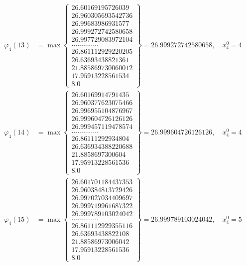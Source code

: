 \documentclass{article}
\begin{document}
\begin{align*}
  
  
  
\varphi_{4}(13) &= \max \left\{ \begin{array}{c}
26.60169195726039 \\
 26.960305693542736 \\
 26.99683986931577 \\
 26.999272742580658 \\
 26.997729083972104 \\
 .............. \\
 26.861112929220205 \\
 26.63693438821361 \\
 21.885869730060012 \\
 17.95913228561534 \\
 8.0
\end{array} \right\} = 26.999272742580658, \quad x_{4}^0 = 4\\
  
  
  
  
\varphi_{4}(14) &= \max \left\{ \begin{array}{c}
26.60169914791435 \\
 26.960377623075466 \\
 26.996955104876967 \\
 26.999604726126126 \\
 26.999457119478574 \\
 .............. \\
 26.86111292934804 \\
 26.636934388220688 \\
 21.8858697300604 \\
 17.95913228561536 \\
 8.0
\end{array} \right\} = 26.999604726126126, \quad x_{4}^0 = 4\\
  
  
  
  
\varphi_{4}(15) &= \max \left\{ \begin{array}{c}
26.601701184437353 \\
 26.960384813729426 \\
 26.997027034409697 \\
 26.999719961687322 \\
 26.999789103024042 \\
 .............. \\
 26.861112929355116 \\
 26.63693438822108 \\
 21.88586973006042 \\
 17.95913228561536 \\
 8.0
\end{array} \right\} = 26.999789103024042, \quad x_{4}^0 = 5\\
  

\end{align*}
\end{document}

